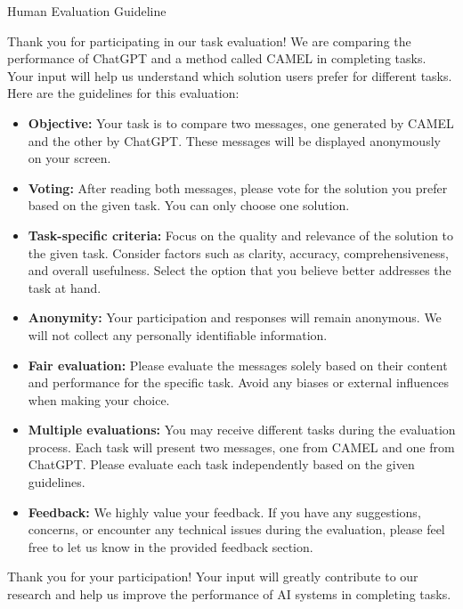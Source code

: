 \begin{AIBox}{Human Evaluation Guideline}

	Thank you for participating in our task evaluation! We are comparing the performance of ChatGPT and a method called CAMEL in completing tasks. Your input will help us understand which solution users prefer for different tasks. Here are the guidelines for this evaluation:\\

	\begin{itemize}

		\item \textbf{Objective:} Your task is to compare two messages, one generated by CAMEL and the other by ChatGPT. These messages will be displayed anonymously on your screen.

		\item \textbf{Voting:} After reading both messages, please vote for the solution you prefer based on the given task. You can only choose one solution.

		\item \textbf{Task-specific criteria:} Focus on the quality and relevance of the solution to the given task. Consider factors such as clarity, accuracy, comprehensiveness, and overall usefulness. Select the option that you believe better addresses the task at hand.

		\item \textbf{Anonymity:} Your participation and responses will remain anonymous. We will not collect any personally identifiable information.

		\item \textbf{Fair evaluation:} Please evaluate the messages solely based on their content and performance for the specific task. Avoid any biases or external influences when making your choice.

		\item \textbf{Multiple evaluations:} You may receive different tasks during the evaluation process. Each task will present two messages, one from CAMEL and one from ChatGPT. Please evaluate each task independently based on the given guidelines.

		\item \textbf{Feedback:} We highly value your feedback. If you have any suggestions, concerns, or encounter any technical issues during the evaluation, please feel free to let us know in the provided feedback section.
	\end{itemize}


	Thank you for your participation! Your input will greatly contribute to our research and help us improve the performance of AI systems in completing tasks.
\end{AIBox}

